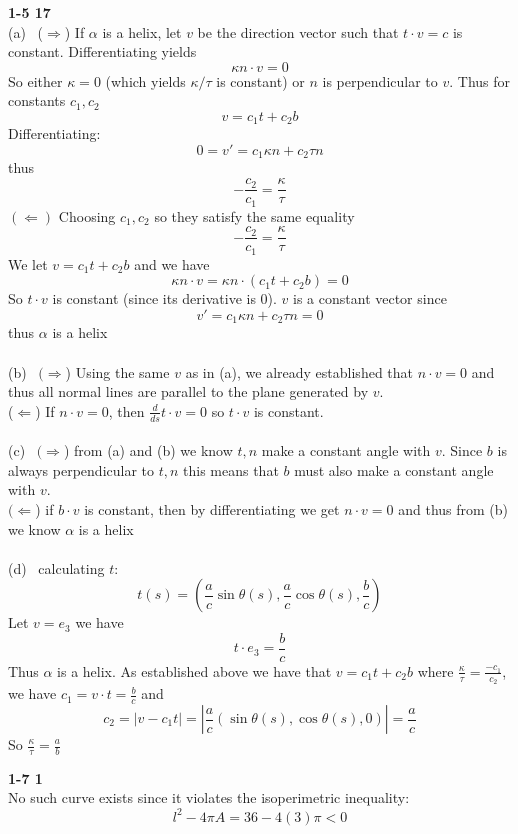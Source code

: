 \documentclass[12pt]{article}
\newenvironment{ques}[1]{\textbf{#1}\vspace{1 mm}\\ }{\bigskip}
\theoremstyle{definition}
\renewcommand{\l}{\left }
\renewcommand{\r}{\right }
\renewcommand{\a}{\alpha}
\begin{document}
\begin{ques}{1-5 17}
	(a) \ ($\Rightarrow$) If $\a$ is a helix, let $v$ be the direction vector
	such that $t \cdot v = c$ is constant. Differentiating yields
	$$\kappa n \cdot v = 0$$
	So either $\kappa = 0$ (which yields $\kappa / \tau$ is constant) or $n$ is
	perpendicular to $v$.  Thus for constants $c_1, c_2$
	$$v = c_1t + c_2 b$$
	Differentiating:
	$$0 = v' = c_1\kappa n + c_2 \tau n$$
	thus
	$$-\frac{c_2}{c_1} = \frac \kappa \tau$$
	$(\Leftarrow )$ Choosing $c_1, c_2$ so they satisfy the same equality
	$$-\frac{c_2}{c_1} = \frac \kappa \tau$$
	We let $v = c_1t + c_2 b$ and we have
	$$\kappa n \cdot v = \kappa n \cdot (c_1t + c_2 b) = 0$$
	So $t \cdot v$ is constant (since its derivative is $0$). $v$ is a constant
	vector since 
	$$v' =  c_1\kappa n + c_2 \tau n = 0$$
	thus $\a$ is a helix\\
	\\
	(b) \ $(\Rightarrow$) Using the same $v$ as in (a), we already established
	that $n \cdot v = 0$ and thus all normal lines are parallel to the plane
	generated by $v$.\\
	($\Leftarrow$) If $n \cdot v = 0$, then $\frac{d}{ds} t \cdot v = 0$ so $t
	\cdot v$ is constant.\\
	\\
	(c) \ $(\Rightarrow$) from (a) and (b) we know $t,n$ make a constant angle
	with $v$. Since $b$ is always perpendicular to $t, n$ this means that $b$
	must also make a constant angle with $v$.\\
	$(\Leftarrow$) if $b \cdot v$ is constant, then by differentiating we get
	$n \cdot v = 0$ and thus from (b) we know $\a$ is a helix
	\\
	\\
	(d) \ calculating $t$:
	$$t(s) = \l( \frac a c \sin \theta(s), \frac a c \cos \theta(s), \frac b c\r)$$
	Let $v = e_3$ we have
	$$t \cdot e_3 = \frac b c$$
	Thus $\a$ is a helix. As established above we have that $v = c_1t + c_2b$
	where $\frac{\kappa}{\tau} = \frac{-c_1}{c_2}$, we have $c_1 = v \cdot t =
	\frac b c$ and 
	$$c_2 = |v - c_1t| = |\frac a c (\sin \theta(s), \cos \theta(s), 0)| = \frac a c$$
	So $\frac \kappa \tau = \frac a b$
\end{ques}

\begin{ques}{1-7 1}
	No such curve exists since it violates the isoperimetric inequality:
	$$l^2 - 4\pi A = 36 - 4(3)\pi < 0$$
\end{ques}
\end{document}

